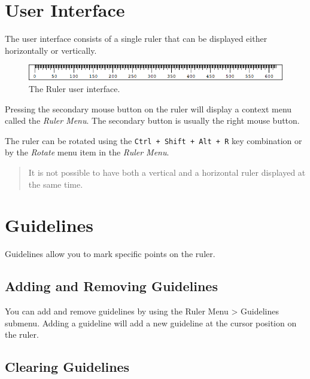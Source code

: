 \documentclass[
]{book}
\begin{document}
\hypertarget{ui}{%
\chapter{User Interface}\label{ui}}

The user interface consists of a single ruler that can be displayed either horizontally or vertically.

\begin{figure}
\includegraphics[width=1\linewidth]{images/ruler} \caption{The Ruler user interface.}\label{fig:unnamed-chunk-1}
\end{figure}

Pressing the secondary mouse button on the ruler will display a context menu called the \emph{Ruler Menu}.
The secondary button is usually the right mouse button.

The ruler can be rotated using the \texttt{Ctrl\ +\ Shift\ +\ Alt\ +\ R} key combination or by the \emph{Rotate} menu item in the \emph{Ruler Menu}.

\begin{quote}
It is not possible to have both a vertical and a horizontal ruler displayed at the same time.
\end{quote}

\hypertarget{guidelines}{%
\chapter{Guidelines}\label{guidelines}}

Guidelines allow you to mark specific points on the ruler.

\hypertarget{adding-and-removing-guidelines}{%
\section{Adding and Removing Guidelines}\label{adding-and-removing-guidelines}}

You can add and remove guidelines by using the Ruler Menu \textgreater{} Guidelines submenu.
Adding a guideline will add a new guideline at the cursor position on the ruler.

\hypertarget{clearing-guidelines}{%
\section{Clearing Guidelines}\label{clearing-guidelines}}
\end{document}
